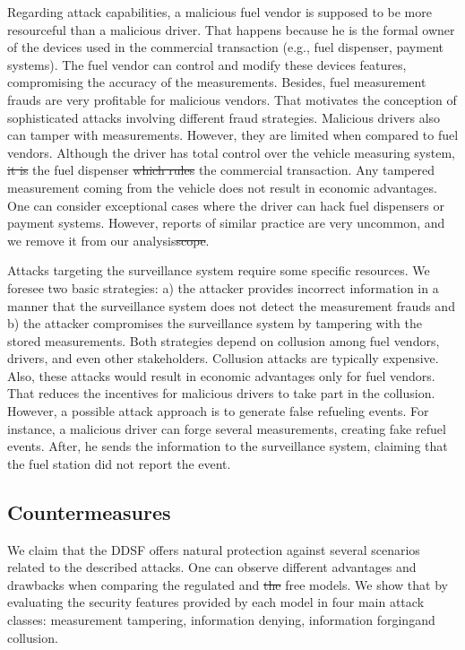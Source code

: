 \documentclass[sigplan]{acmart}
\providecommand{\DIFadd}[1]{{\protect\color{blue}\uwave{#1}}} %
\providecommand{\DIFdel}[1]{{\protect\color{red}\sout{#1}}}                      %
\providecommand{\DIFaddbegin}{} %
\providecommand{\DIFaddend}{} %
\providecommand{\DIFdelbegin}{} %
\providecommand{\DIFdelend}{} %
\begin{document}
Regarding attack capabilities, a malicious fuel vendor is supposed to be more resourceful than a malicious driver. 
That happens because he is the formal owner of the devices used in the commercial transaction (e.g., fuel dispenser, payment systems).
The fuel vendor can control and modify these devices features, compromising the accuracy of the measurements.
Besides, fuel measurement frauds are very profitable for malicious vendors.
That motivates the conception of sophisticated attacks involving different fraud strategies. 
Malicious drivers also can tamper with measurements.
However, they are limited when compared to fuel vendors.
Although the driver has total control over the vehicle measuring system, \DIFdelbegin \DIFdel{it is }\DIFdelend the fuel dispenser \DIFdelbegin \DIFdel{which rules }\DIFdelend \DIFaddbegin \DIFadd{controls }\DIFaddend the commercial transaction.
Any tampered measurement coming from the vehicle does not result in economic advantages.
One can consider exceptional cases where the driver can hack fuel dispensers or payment systems.
However, reports of similar practice are very uncommon, and we remove it from our analysis\DIFdelbegin \DIFdel{scope}\DIFdelend .

Attacks targeting the surveillance system require some specific resources.
We foresee two basic strategies: a) the attacker provides incorrect information in a manner that the surveillance system does not detect the measurement frauds and b) the attacker compromises the surveillance system by tampering with the stored measurements.
Both strategies depend on collusion among fuel vendors, drivers, and even other stakeholders.
Collusion attacks are typically expensive.
Also, these attacks would result in economic advantages only for fuel vendors.
That reduces the incentives for malicious drivers to take part in the collusion.
However, a possible attack approach is to generate false refueling events.
For instance, a malicious driver can forge several measurements, creating fake refuel events.
After, he sends the information to the surveillance system, claiming that the fuel station did not report the event.

\subsection{Countermeasures}
We claim that the DDSF offers natural protection against several scenarios related to the described attacks.
One can observe different advantages and drawbacks when comparing the regulated and \DIFdelbegin \DIFdel{the }\DIFdelend free models.
We show that by evaluating the security features provided by each model in four main attack classes: measurement tampering, information denying, information forging\DIFaddbegin \DIFadd{, }\DIFaddend and collusion.
\end{document}
